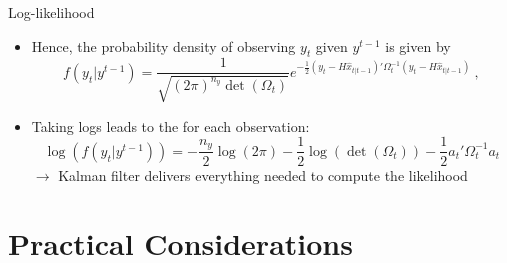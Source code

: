 \documentclass[handout,usepdftitle=false,xcolor=dvipsnames,aspectratio=169]{beamer}
\begin{document}
\begin{frame}{Log-likelihood}
  \begin{itemize}
    \item Hence, the probability density of observing $y_t$ given $y^{t-1}$ is given by
          \begin{equation*}
            f\left( {{y_t}|{y^{t - 1}}} \right) = \frac{1}{{\sqrt {{{\left( {2\pi } \right)}^{n_y}}\det \left( {{\Omega _t}} \right)} }}{e^{ - \frac{1}{2}\left( {{y_t} - H{{\hat x}_{t|t-1}}} \right)'\Omega _t^{ - 1}\left( {{y_t} - H{{\hat x}_{t|t-1}}} \right)}} \: ,
          \end{equation*}

    \item Taking logs leads to the  for each observation:
          \begin{equation}
            \log \left( {f\left( {{y_t}|{y^{t - 1}}} \right)} \right) =  - \frac{{n_y}}{2}\log \left( {2\pi } \right) - \frac{1}{2}\log\left(\det \left( {{\Omega _t}} \right)\right) - \frac{1}{2}{a_t}'\Omega _t^{ - 1}{a_t}
          \end{equation}
          $\rightarrow$ Kalman filter delivers everything needed to compute the likelihood\vspace{0.2cm}
  \end{itemize}
\end{frame}



\section{Practical Considerations}
\end{document}
